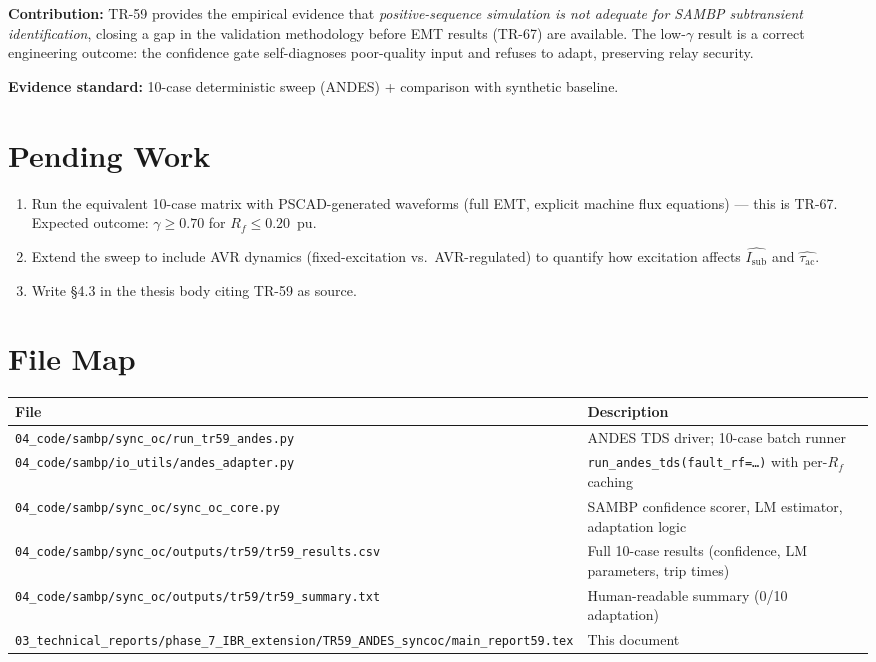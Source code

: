 \documentclass[11pt,a4paper]{article}
\newcommand{\Isub}{I_{\text{sub}}}
\newcommand{\tauac}{\tau_{\text{ac}}}
\newcommand{\gconf}{\gamma}
\begin{document}
\textbf{Contribution:}
TR-59 provides the empirical evidence that \emph{positive-sequence simulation
is not adequate for SAMBP subtransient identification}, closing a gap in the
validation methodology before EMT results (TR-67) are available.  The
low-$\gconf$ result is a correct engineering outcome: the confidence gate
self-diagnoses poor-quality input and refuses to adapt, preserving relay
security.

\textbf{Evidence standard:} 10-case deterministic sweep (ANDES) + comparison
with synthetic baseline.

\section{Pending Work}
\label{sec:pending}

\begin{enumerate}
  \item Run the equivalent 10-case matrix with PSCAD-generated waveforms
        (full EMT, explicit machine flux equations) — this is TR-67.
        Expected outcome: $\gconf \geq 0.70$ for $R_f \leq 0.20$~pu.
  \item Extend the sweep to include AVR dynamics (fixed-excitation vs.\
        AVR-regulated) to quantify how excitation affects $\hat{\Isub}$
        and $\hat{\tauac}$.
  \item Write \S4.3 in the thesis body citing TR-59 as source.
\end{enumerate}

\appendix
\section{File Map}
\label{app:files}

\begin{tabular}{ll}
  \toprule
  File & Description \\
  \midrule
  \texttt{04\_code/sambp/sync\_oc/run\_tr59\_andes.py}
    & ANDES TDS driver; 10-case batch runner \\
  \texttt{04\_code/sambp/io\_utils/andes\_adapter.py}
    & \texttt{run\_andes\_tds(fault\_rf=…)} with per-$R_f$ caching \\
  \texttt{04\_code/sambp/sync\_oc/sync\_oc\_core.py}
    & SAMBP confidence scorer, LM estimator, adaptation logic \\
  \texttt{04\_code/sambp/sync\_oc/outputs/tr59/tr59\_results.csv}
    & Full 10-case results (confidence, LM parameters, trip times) \\
  \texttt{04\_code/sambp/sync\_oc/outputs/tr59/tr59\_summary.txt}
    & Human-readable summary (0/10 adaptation) \\
  \texttt{03\_technical\_reports/phase\_7\_IBR\_extension/TR59\_ANDES\_syncoc/main\_report59.tex}
    & This document \\
  \bottomrule
\end{tabular}



\end{document}
